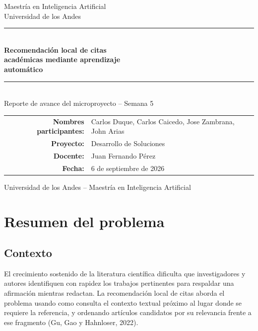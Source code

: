 \documentclass[11pt]{article}
\begin{document}
\begin{titlepage}
\centering
\vspace*{2.5cm}

{\Large \color{midgray} Maestría en Inteligencia Artificial}\\[0.2cm]
{\large \color{midgray} Universidad de los Andes}\\[2.5cm]

{\color{primaryblue}\rule{\linewidth}{1.2pt}}\\[0.6cm]
{\Huge \bfseries \color{primaryblue} Recomendación local de citas\\ académicas mediante aprendizaje\\ automático}\\[0.6cm]
{\color{primaryblue}\rule{\linewidth}{1.2pt}}\\[0.8cm]

{\Large Reporte de avance del microproyecto -- Semana 5}\\[3cm]

\begin{tabular}{rl}
\textbf{Nombres participantes:} & Carlos Duque, Carlos Caicedo, Jose Zambrana, John Arias \\[4pt]
\textbf{Proyecto:} & Desarrollo de Soluciones \\[4pt]
\textbf{Docente:} & Juan Fernando Pérez \\[4pt]
\textbf{Fecha:} & 6 de septiembre de 2026 \\
\end{tabular}

\vfill
{\small \color{midgray} Universidad de los Andes -- Maestría en Inteligencia Artificial}
\end{titlepage}

\section{Resumen del problema}

\subsection{Contexto}

El crecimiento sostenido de la literatura científica dificulta que investigadores y autores identifiquen con rapidez los trabajos pertinentes para respaldar una afirmación mientras redactan. La recomendación local de citas aborda el problema usando como consulta el contexto textual próximo al lugar donde se requiere la referencia, y ordenando artículos candidatos por su relevancia frente a ese fragmento (Gu, Gao y Hahnloser, 2022).
\end{document}
